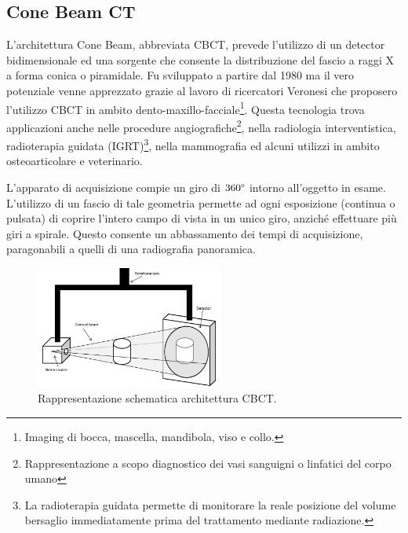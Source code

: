 \documentclass[a4paper,12pt, doubleside]{report}
\begin{document}
            \subsection{Cone Beam CT}
                \par
                    L'architettura Cone Beam, abbreviata CBCT, prevede l'utilizzo di un detector bidimensionale ed una sorgente che consente la distribuzione del fascio a raggi X a forma conica o piramidale. Fu sviluppato a partire dal 1980 ma il vero potenziale venne apprezzato grazie al lavoro di ricercatori Veronesi che proposero l'utilizzo CBCT in ambito dento-maxillo-facciale\footnote{Imaging di bocca, mascella, mandibola, viso e collo.}. Questa tecnologia trova applicazioni anche nelle procedure angiografiche\footnote{Rappresentazione a scopo diagnostico dei vasi sanguigni o linfatici del corpo umano}, nella radiologia interventistica, radioterapia guidata (IGRT)\footnote{La radioterapia guidata permette di monitorare la reale posizione del volume bersaglio immediatamente prima del trattamento mediante radiazione.}, nella mammografia ed alcuni utilizzi in ambito osteoarticolare e veterinario.
                
                \bigskip
                \par
                    L'apparato di acquisizione compie un giro di $360\degree$ intorno all'oggetto in esame. L'utilizzo di un fascio di tale geometria permette ad ogni esposizione (continua o pulsata) di coprire l'intero campo di vista in un unico giro, anziché effettuare più giri a spirale. Questo consente un abbassamento dei tempi di acquisizione, paragonabili a quelli di una radiografia panoramica.
                                   
                    \begin{figure}[h]
                        \centering
                        \includegraphics[width=0.55\textwidth]{cone_beam}
                        \caption{Rappresentazione schematica architettura CBCT.}
                        \label{fig:cbct}
                    \end{figure}
                    
\end{document}
